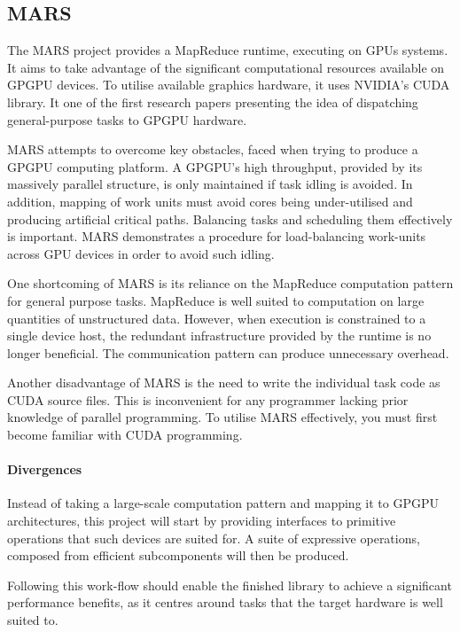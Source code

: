 \subsection{MARS}
The MARS\cite{mars} project provides a MapReduce\cite{mapreduce} runtime, executing on \acp{GPU} systems.
It aims to take advantage of the significant computational resources available on \ac{GPGPU} devices. To utilise available graphics hardware, it uses NVIDIA's \ac{CUDA} library. It one of the first research papers presenting the idea of dispatching general-purpose tasks to \ac{GPGPU} hardware.

MARS attempts to overcome key obstacles, faced when trying to produce a \ac{GPGPU} computing platform.
A \ac{GPGPU}'s high throughput, provided by its massively parallel structure, is only maintained if task idling is avoided. In addition, mapping of work units must avoid cores being under-utilised and producing artificial critical paths. Balancing tasks and scheduling them effectively is important. MARS demonstrates a procedure for load-balancing work-units across \ac{GPU} devices in order to avoid such idling.

One shortcoming of MARS is its reliance on the MapReduce computation pattern for general purpose tasks. MapReduce is well suited to computation on large quantities of unstructured data. However, when execution is constrained to a single device host, the redundant infrastructure provided by the runtime is no longer beneficial. The communication pattern can produce unnecessary overhead.

Another disadvantage of MARS is the need to write the individual task code as \ac{CUDA} source files. This is inconvenient for any programmer lacking prior knowledge of parallel programming. To utilise MARS effectively, you must first become familiar with \ac{CUDA} programming.

\paragraph{Divergences}
Instead of taking a large-scale computation pattern and mapping it to \ac{GPGPU} architectures, this project will start by providing interfaces to primitive operations that such devices are suited for. A suite of expressive operations, composed from efficient subcomponents will then be produced.

Following this work-flow should enable the finished library to achieve a significant performance benefits, as it centres around tasks that the target hardware is well suited to.

